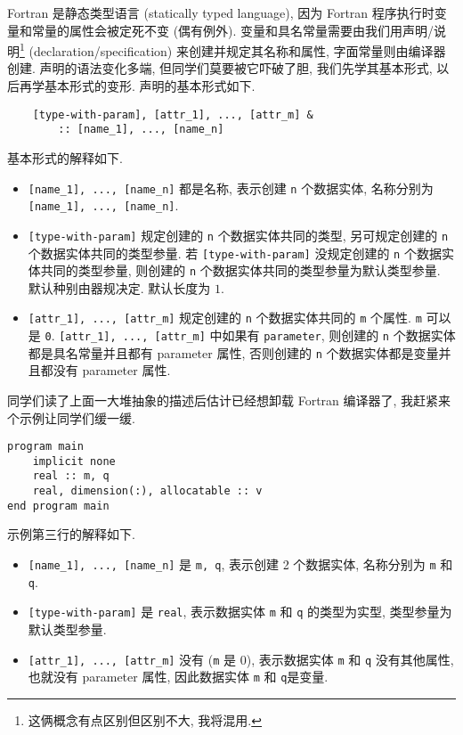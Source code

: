 Fortran 是静态类型语言 (statically typed language), 因为 Fortran 程序执行时变量和常量的属性会被定死不变 (偶有例外). 变量和具名常量需要由我们用声明/说明\footnote{这俩概念有点区别但区别不大, 我将混用.} (declaration/specification) 来创建并规定其名称和属性, 字面常量则由编译器创建. 声明的语法变化多端, 但同学们莫要被它吓破了胆, 我们先学其基本形式, 以后再学基本形式的变形. 声明的基本形式如下.
\begin{lstlisting}
    [type-with-param], [attr_1], ..., [attr_m] &
        :: [name_1], ..., [name_n]
\end{lstlisting}
基本形式的解释如下.
\begin{itemize}
    \item \texttt{[name\_{}1], ..., [name\_{}n]} 都是名称, 表示创建 \texttt{n} 个数据实体, 名称分别为 \texttt{[name\_{}1], ..., [name\_{}n]}.
    \item \texttt{[type-with-param]} 规定创建的 \texttt{n} 个数据实体共同的类型, 另可规定创建的 \texttt{n} 个数据实体共同的类型参量. 若 \texttt{[type-with-param]} 没规定创建的 \texttt{n} 个数据实体共同的类型参量, 则创建的 \texttt{n} 个数据实体共同的类型参量为默认类型参量. 默认种别由器规决定. 默认长度为 $1$.
    \item \texttt{[attr\_{}1], ..., [attr\_{}m]} 规定创建的 \texttt{n} 个数据实体共同的 \texttt{m} 个属性. \texttt{m} 可以是 \texttt{0}. \texttt{[attr\_{}1], ..., [attr\_{}m]} 中如果有 \texttt{parameter}, 则创建的 \texttt{n} 个数据实体都是具名常量并且都有 parameter 属性, 否则创建的 \texttt{n} 个数据实体都是变量并且都没有 parameter 属性.
\end{itemize}
同学们读了上面一大堆抽象的描述后估计已经想卸载 Fortran 编译器了, 我赶紧来个示例让同学们缓一缓. 
\begin{lstlisting}
program main
    implicit none
    real :: m, q
    real, dimension(:), allocatable :: v
end program main
\end{lstlisting}
示例第三行的解释如下.
\begin{itemize}
    \item \texttt{[name\_{}1], ..., [name\_{}n]} 是 \texttt{m, q}, 表示创建 2 个数据实体, 名称分别为 \texttt{m} 和 \texttt{q}.
    \item \texttt{[type-with-param]} 是 \texttt{real}, 表示数据实体 \texttt{m} 和 \texttt{q} 的类型为实型, 类型参量为默认类型参量.
    \item \texttt{[attr\_{}1], ..., [attr\_{}m]} 没有 (\texttt{m} 是 0), 表示数据实体 \texttt{m} 和 \texttt{q} 没有其他属性, 也就没有 parameter 属性, 因此数据实体 \texttt{m} 和 \texttt{q}是变量.
\end{itemize}
